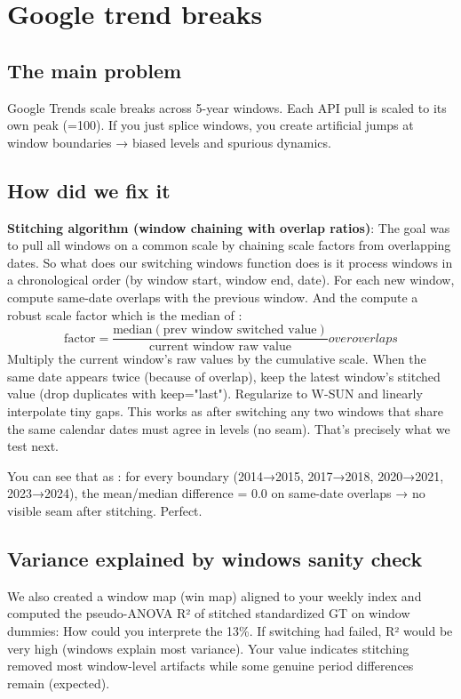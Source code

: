 \documentclass{article}
\begin{document}
\section{Google trend breaks}
\subsection{The main problem}
Google Trends scale breaks across 5-year windows. Each API pull is scaled to its own peak (=100). If you just splice windows, you create artificial jumps at window boundaries → biased levels and spurious dynamics.

\subsection{How did we fix it}
\textbf{Stitching algorithm (window chaining with overlap ratios)}:
The goal was to pull all windows on a common scale by chaining scale factors from overlapping dates.
So what does our switching windows function does is it process windows in a chronological order (by window start, window end, date). For each new window, compute same-date overlaps with the previous window.
And the compute a robust scale factor which is the median of :
\[
\text{factor} = \frac{\text{median}(\text{prev window switched value})}{\text{current window raw value}}over overlaps
\]
Multiply the current window’s raw values by the cumulative scale.
When the same date appears twice (because of overlap), keep the latest window’s stitched value (drop duplicates with keep="last").
Regularize to W-SUN and linearly interpolate tiny gaps.
This works as after switching any two windows that share the same calendar dates must agree in levels (no seam). That’s precisely what we test next.

You can see that as : for every boundary (2014→2015, 2017→2018, 2020→2021, 2023→2024), the mean/median difference = 0.0 on same-date overlaps → no visible seam after stitching. Perfect.

\subsection{Variance explained by windows sanity check}
We also created a window map (win map) aligned to your weekly index and computed the pseudo-ANOVA R² of stitched standardized GT on window dummies:
How could you interprete the 13\%. If switching 
had failed, R² would be very high (windows explain most variance). Your value indicates stitching removed most window-level artifacts while some genuine period differences remain (expected).
\end{document}
